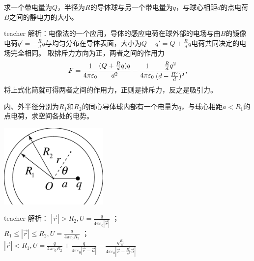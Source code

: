 \begin{example}
求一个带电量为$Q$，半径为$R$的导体球与另一个带电量为$q$，与球心相距$d$的点电荷$B$之间的静电力的大小。
\begin{taggedblock}{teacher}
\newline
解析：电像法的一个应用，导体的感应电荷在球外部的电场与由$B$的镜像电荷$q' = - \frac{R}{d}q$与均匀分布在导体表面，大小为$Q-q' = Q + \frac{R}{d}q$电荷共同决定的电场完全相同。
取排斥力方向为正，两者之间的作用力
\[
F = \frac{1}{4\pi\varepsilon_0} \frac{(Q+\frac{R}{d}q)q}{d^2}-\frac{1}{4\pi\varepsilon_0} \frac{ \frac{R}{d}q^2}{(d- \frac{R^2}{d})^2},
\]
将上式化简就可得两者之间的作用力，正则是排斥力，反之是吸引力。
\end{taggedblock}
\end{example}


\begin{example}
内、外半径分别为$R_1$和$R_2$的同心导体球内部有一个电量为$q$，与球心相距$a<R_1$的点电荷，求空间各处的电势。
\begin{flushright}
\includegraphics[width=0.4\textwidth]{images/elec-problem-14.pdf}
\end{flushright}
\begin{taggedblock}{teacher}
\noindent
解析：
$|\vec{r}|>R_2,U=\frac{q}{4\pi\varepsilon_0|\vec{r}|}$ ；
\\$R_1\leq|\vec{r}|\leq R_2,U=\frac{q}{4\pi\varepsilon_0R_2}$ ；
\\$|\vec{r}|<R_1,U=\frac{q}{4\pi\varepsilon_0R_2}+\frac{q}{4\pi\varepsilon_0|\vec{r}-\vec{a}|}-\frac{q\frac{R_1}{a}}{4\pi\varepsilon_0|\vec{r}-\frac{R_1^2}{a^2}\vec{a}|}$
\end{taggedblock}
\end{example}








